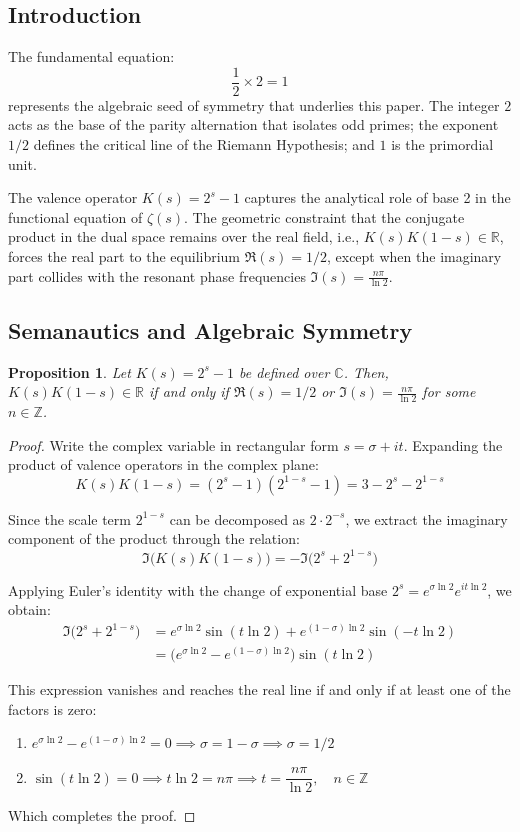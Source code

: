 \documentclass[12pt,a4paper]{article}
\theoremstyle{plain}
\newtheorem{proposition}[theorem]{Proposition}
\begin{document}
\subsection{Introduction}

The fundamental equation:
\[
\frac{1}{2} \times 2 = 1
\]
represents the algebraic seed of symmetry that underlies this paper.
The integer $2$ acts as the base of the parity alternation that
isolates odd primes; the exponent $1/2$ defines the critical line of
the Riemann Hypothesis; and $1$ is the primordial unit.

The valence operator $K(s) = 2^s - 1$ captures the analytical role of
base 2 in the functional equation of $\zeta(s)$. The geometric
constraint that the conjugate product in the dual space remains over
the real field, i.e., $K(s)K(1-s) \in \mathbb{R}$, forces the real part
to the equilibrium $\mathfrak{R}(s) = 1/2$, except when the imaginary
part collides with the resonant phase frequencies
$\mathfrak{I}(s) = \frac{n\pi}{\ln 2}$.

\subsection{Semanautics and Algebraic Symmetry}

\begin{proposition}
Let $K(s) = 2^s - 1$ be defined over $\mathbb{C}$. Then,
$K(s)K(1-s) \in \mathbb{R}$ if and only if
$\mathfrak{R}(s) = 1/2$ or
$\mathfrak{I}(s) = \frac{n\pi}{\ln 2}$ for some $n \in \mathbb{Z}$.
\end{proposition}

\begin{proof}
Write the complex variable in rectangular form $s = \sigma + it$.
Expanding the product of valence operators in the complex plane:
\[
K(s)K(1-s) = (2^s - 1)(2^{1-s} - 1) = 3 - 2^s - 2^{1-s}
\]

Since the scale term $2^{1-s}$ can be decomposed as
$2 \cdot 2^{-s}$, we extract the imaginary component of the product
through the relation:
\[
\mathfrak{I}\bigl(K(s)K(1-s)\bigr) = -\mathfrak{I}\bigl(2^s + 2^{1-s}\bigr)
\]

Applying Euler's identity with the change of exponential base
$2^s = e^{\sigma \ln 2} e^{i t \ln 2}$, we obtain:
\begin{align*}
\mathfrak{I}\bigl(2^s + 2^{1-s}\bigr)
&= e^{\sigma \ln 2} \sin(t \ln 2) + e^{(1-\sigma) \ln 2} \sin(-t \ln 2) \\
&= \bigl( e^{\sigma \ln 2} - e^{(1-\sigma) \ln 2} \bigr) \sin(t \ln 2)
\end{align*}

This expression vanishes and reaches the real line if and only if
at least one of the factors is zero:
\begin{enumerate}
    \item $e^{\sigma \ln 2} - e^{(1-\sigma) \ln 2} = 0 \implies
      \sigma = 1 - \sigma \implies \sigma = 1/2$
    \item $\sin(t \ln 2) = 0 \implies t \ln 2 = n\pi \implies
      t = \dfrac{n\pi}{\ln 2},\quad n \in \mathbb{Z}$
\end{enumerate}
Which completes the proof.
\end{proof}
\end{document}
